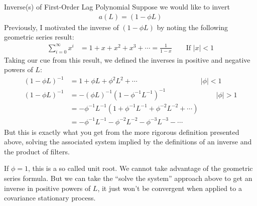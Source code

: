 \documentclass[aspectratio=169, handout]{beamer}
\begin{document}
{\scriptsize
\begin{frame}{Inverse(s) of First-Order Lag Polynomial}
Suppose we would like to invert
\begin{align*}
  a(L) = (1-\phi L)
\end{align*}
Previously, I motivated the inverse of $(1-\phi L)$ by noting the
following geometric series result:
\begin{align*}
  \sum_{i=0}^\infty
  x^i
  &=
  1 + x + x^2 + x^3 + \cdots
  =
  \frac{1}{1-x}
  \qquad
  \text{If $|x|<1$}
\end{align*}
\pause
Taking our cue from this result, we defined the inverses in positive
and negative powers of $L$:
\begin{align*}
  (1-\phi L)^{-1}
  &=
  1 + \phi L + \phi^2 L^2 + \cdots
  \qquad
  \qquad
  \qquad
  \qquad
  \quad
  |\phi|<1
  \\
  (1-\phi L)^{-1}
  &=
  -(\phi L)^{-1}(1-\phi^{-1} L^{-1})^{-1}
  \qquad
  \qquad
  \qquad
  \quad
  \,
  |\phi|>1
  \\
  &=
  -
  \phi^{-1}L^{-1}
  (1+ \phi^{-1}L^{-1} + \phi^{-2}L^{-2} + \cdots)
  \\
  &=
  -
  \phi^{-1}L^{-1} - \phi^{-2}L^{-2} - \phi^{-3}L^{-3} - \cdots
\end{align*}
\pause
But this is \alert{exactly} what you get from
the more rigorous definition presented above,
solving the associated system
implied by the definitions of an inverse and the product of filters.

If $\phi=1$, this is a so called \alert{unit root}. We cannot
take advantage of the geometric series formula.
But we can take the ``solve the system'' approach above to get an
inverse in positive powers of $L$, it just won't be convergent when
applied to a covariance stationary process.
\end{frame}
}
\end{document}
